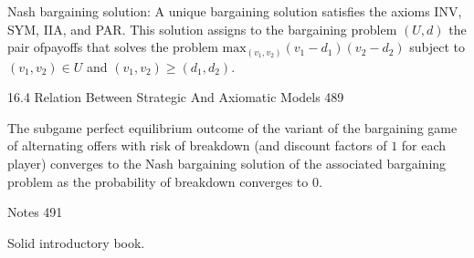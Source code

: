Nash bargaining solution: A unique bargaining solution satisfies the axioms INV, SYM, IIA, and PAR. This solution assigns to the bargaining problem $(U,d)$ the pair ofpayoffs that solves the problem $\text{max}_{(v_1,v_2)}(v_1-d_1)(v_2-d_2)$ subject to $(v_1,v_2) \in U$ and $(v_1,v_2)\ge (d_1,d_2)$.

16.4 Relation Between Strategic And Axiomatic Models 489

The subgame perfect equilibrium outcome of the variant of the bargaining game of alternating offers with risk of breakdown (and discount factors of $1$ for each player) converges to the Nash bargaining solution of the associated bargaining problem as the probability of breakdown converges to $0$.

Notes 491

Solid introductory book.